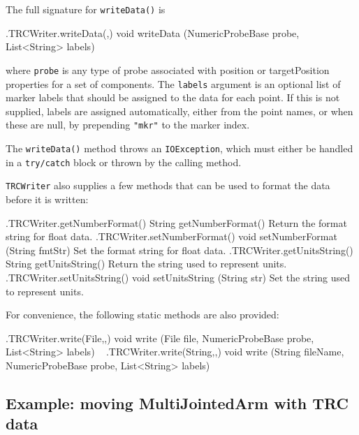 The full signature for {\tt writeData()} is
%
\begin{methodtable}{0.7}{0.3}
%
\methodentry
{\probes.TRCWriter.writeData(,)}%
{void writeData (NumericProbeBase probe, List<String> labels)}%
{\ }%
%
\end{methodtable}
%
where {\tt probe} is any type of probe associated with {\sf position} or {\sf
targetPosition} properties for a set of  components.
The {\tt labels} argument is an optional list of marker labels that should be
assigned to the data for each point. If this is not supplied, labels are
assigned automatically, either from the point names, or when these are null, by
prepending {\tt "mkr"} to the marker index.

\begin{sideblock}
The {\tt writeData()} method throws an {\tt IOException}, which must either be
handled in a {\tt try/catch} block or thrown by the calling method.
\end{sideblock}

{\tt TRCWriter} also supplies a few methods that can be used
to format the data before it is written:
%
\begin{methodtable}{0.5}{0.5}
\midline
%
\methodentry
{\probes.TRCWriter.getNumberFormat()}%
{String getNumberFormat()}%
{Return the format string for float data.}%
%
\methodentry
{\probes.TRCWriter.setNumberFormat()}%
{void setNumberFormat (String fmtStr)}%
{Set the format string for float data.}%
%
\methodentry
{\probes.TRCWriter.getUnitsString()}%
{String getUnitsString()}%
{Return the string used to represent units.}%
%
\methodentry
{\probes.TRCWriter.setUnitsString()}%
{void setUnitsString (String str)}%
{Set the string used to represent units.}%
%
\midline
\end{methodtable}
%

For convenience, the following static methods are also provided:
%
\begin{methodtable}{0.7}{0.3}
%
\methodentry
{\probes.TRCWriter.write(File,,)}%
{void write (File file, NumericProbeBase probe, List<String> labels)}%
{\ }%
\methodspace{0.5em}%
%
\methodentry
{\probes.TRCWriter.write(String,,)}%
{void write (String fileName, NumericProbeBase probe, List<String> labels)}%
{\ }%
%
\end{methodtable}

\subsection{Example: moving MultiJointedArm with TRC data}
\label{TRCMultiJointedArm:sec}

